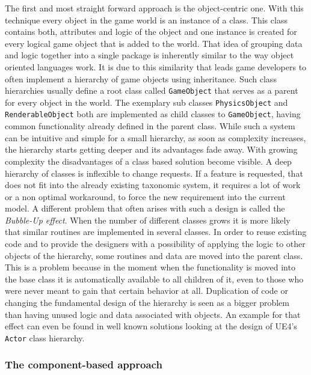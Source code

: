 The first and most straight forward approach is the object-centric one. With this technique every object in the game world is an instance of a class. This class contains both, attributes and logic of the object and one instance is created for every logical game object that is added to the world. That idea of grouping data and logic together into a single package is inherently similar to the way object oriented languages work. It is due to this similarity that leads game developers to often implement a hierarchy of game objects using inheritance. Such class hierarchies usually define a root class called \texttt{GameObject} that serves as a parent for every object in the world. The exemplary sub classes \texttt{PhysicsObject} and \texttt{RenderableObject} both are implemented as child classes to \texttt{GameObject}, having common functionality already defined in the parent class. While such a system can be intuitive and simple for a small hierarchy, as soon as complexity increases, the hierarchy starts getting deeper and its advantages fade away. With growing complexity the disadvantages of a class based solution become visible. A deep hierarchy of classes is inflexible to change requests. If a feature is requested, that does not fit into the already existing taxonomic system, it requires a lot of work or a non optimal workaround, to force the new requirement into the current model. 
A different problem that often arises with such a design is called the \textit{Bubble-Up effect}. When the number of different classes grows it is more likely that similar routines are implemented in several classes. In order to reuse existing code and to provide the designers with a possibility of applying the logic to other objects of the hierarchy, some routines and data are moved into the parent class. This is a problem because in the moment when the functionality is moved into the base class it is automatically available to all children of it, even to those who were never meant to gain that certain behavior at all. Duplication of code or changing the fundamental design of the hierarchy is seen as a bigger problem than having unused logic and data associated with objects. An example for that effect can even be found in well known solutions looking at the design of \ac{UE4}'s \texttt{Actor} class hierarchy.

\subsubsection{The component-based approach} \label{ecs_theory}

